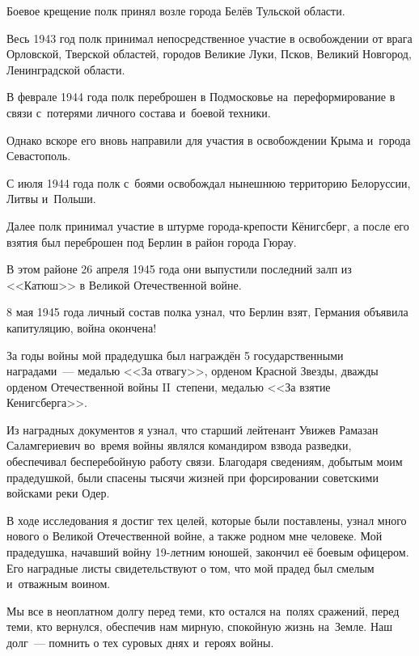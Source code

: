 Боевое крещение полк принял возле города Белёв Тульской области.

Весь 1943 год полк принимал непосредственное участие в освобождении от врага Орловской, Тверской областей, городов Великие Луки, Псков, Великий Новгород, Ленинградской области.

В феврале 1944 года полк переброшен в Подмосковье на~переформирование в связи с~потерями личного состава и~боевой техники.

Однако вскоре его вновь направили для участия в освобождении Крыма и~города Севастополь.

С июля 1944 года полк с~боями освобождал нынешнюю территорию Белоруссии, Литвы и~Польши.

Далее полк принимал участие в штурме города-крепости Кёнигсберг, а после его взятия был переброшен под Берлин в район города Гюрау.

В этом районе 26 апреля 1945 года они выпустили последний залп из <<Катюш>> в Великой Отечественной войне.

8 мая 1945 года личный состав полка узнал, что Берлин взят, Германия объявила капитуляцию, война окончена!

За годы войны мой прадедушка был награждён 5 государственными наградами~--- медалью <<За отвагу>>, орденом Красной Звезды, дважды орденом Отечественной войны II~степени, медалью <<За взятие Кенигсберга>>.

Из наградных документов я узнал, что старший лейтенант Увижев Рамазан Саламгериевич во~время войны являлся командиром взвода разведки, обеспечивал бесперебойную работу связи. Благодаря сведениям, добытым моим прадедушкой, были спасены тысячи жизней при форсировании советскими войсками реки Одер.

В ходе исследования я достиг тех целей, которые были поставлены, узнал много нового о Великой Отечественной войне, а также родном мне человеке. Мой прадедушка, начавший войну 19-летним юношей, закончил её боевым офицером. Его наградные листы свидетельствуют о том, что мой прадед был смелым и~отважным воином.

Мы все в неоплатном долгу перед теми, кто остался на~полях сражений, перед теми, кто вернулся, обеспечив нам мирную, спокойную жизнь на~Земле. Наш долг~--- помнить о тех суровых днях и~героях войны.
